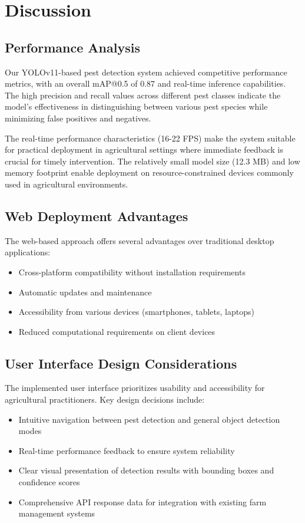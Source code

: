 \documentclass[conference]{IEEEtran}
\begin{document}
\section{Discussion}

\subsection{Performance Analysis}

Our YOLOv11-based pest detection system achieved competitive performance metrics, with an overall mAP@0.5 of 0.87 and real-time inference capabilities. The high precision and recall values across different pest classes indicate the model's effectiveness in distinguishing between various pest species while minimizing false positives and negatives.

The real-time performance characteristics (16-22 FPS) make the system suitable for practical deployment in agricultural settings where immediate feedback is crucial for timely intervention. The relatively small model size (12.3 MB) and low memory footprint enable deployment on resource-constrained devices commonly used in agricultural environments.

\subsection{Web Deployment Advantages}

The web-based approach offers several advantages over traditional desktop applications:
\begin{itemize}
\item Cross-platform compatibility without installation requirements
\item Automatic updates and maintenance
\item Accessibility from various devices (smartphones, tablets, laptops)
\item Reduced computational requirements on client devices
\end{itemize}

\subsection{User Interface Design Considerations}

The implemented user interface prioritizes usability and accessibility for agricultural practitioners. Key design decisions include:
\begin{itemize}
\item Intuitive navigation between pest detection and general object detection modes
\item Real-time performance feedback to ensure system reliability
\item Clear visual presentation of detection results with bounding boxes and confidence scores
\item Comprehensive API response data for integration with existing farm management systems
\end{itemize}
\end{document}
